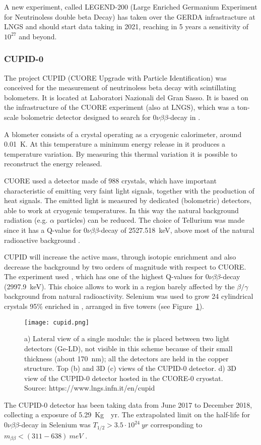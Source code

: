 \documentclass{subnucbo}
\begin{document}
A new experiment, called LEGEND-200 (Large Enriched Germanium Experiment for Neutrinoless double beta Decay) has taken over the GERDA infrastracture at LNGS and should start data taking in 2021, reaching in 5 years a sensitivity of $10^{27}$ and beyond.

\subsubsection{CUPID-0}
The project CUPID (CUORE Upgrade with Particle Identification) was conceived for the measurement of neutrinoless beta decay with scintillating bolometers. It is located at Laboratori Nazionali del Gran Sasso.
It is based on the infrastructure of the CUORE experiment (also at LNGS), which was a ton-scale bolometric detector designed to search for $0\nu\beta\beta$-decay in .

A blometer consists of a crystal operating as a cryogenic calorimeter, around \SI{0.01}{K}. At this temperature a minimum energy release in it produces a temperature variation. By measuring this thermal variation it is possible to reconstruct the energy released.

CUORE used a detector made of 988  crystals, which have important characteristic of emitting very faint light signals, together with the production of heat signals. The emitted light is measured by dedicated (bolometric) detectors, able to work at cryogenic temperatures. In this way the natural background radiation (e.g. $\alpha$ particles) can be reduced.
The choice of Tellurium was made since it has a Q-value for $0\nu\beta\beta$-decay of \SI{2527.518}{keV}, above most of the natural radioactive background \cite{ref:cuore}.

CUPID will increase the active mass, through isotopic enrichment and also decrease the background by two orders of magnitude with respect to CUORE. The experiment used , which has one of the highest Q-values for $0\nu\beta\beta$-decay (\SI{2997.9}{keV}). This choice allows to work in a region barely affected by the $\beta/\gamma$ background from natural radioactivity.
Selenium was used to grow 24 cylindrical  crystals 95\% enriched in , arranged in five towers (see Figure~\ref{fig:cupid}).
\begin{figure}
\centering
\texttt{[image: cupid.png]}
\caption{a) Lateral view of a single module: the  is placed between two light detectors (Ge-LD), not visible in this scheme because of their small thickness (about \SI{170}{nm}); all the detectors are held in the copper structure. Top (b) and 3D (c) views of the CUPID-0 detector. d) 3D view of the CUPID-0 detector hosted in the CUORE-0 cryostat. Source: https://www.lngs.infn.it/en/cupid}
\label{fig:cupid}
\end{figure}
The CUPID-0 detector has been taking data from June 2017 to December 2018, collecting a  exposure of \SI{5.29}{Kg\cdot yr}. The extrapolated limit on the half-life for $0\nu\beta\beta$-decay in Selenium was $T_{1/2}>3.5\cdot10^{24}\SI{}{yr}$ corresponding to $m_{\beta\beta}<(311-638)\SI{}{meV}$ \cite{ref:cupid}. 
\end{document}
